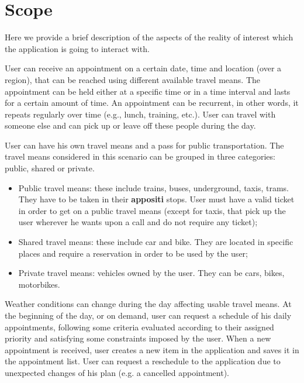\section{Scope}
Here we provide a brief description of the aspects of the reality of interest which the application is going to interact with.

User can receive an appointment on a certain date, time and location (over a region), that can be reached using different available travel means. The appointment can be held either at a specific time or in a time interval and lasts for a certain amount of time. An appointment can be recurrent, in other words, it repeats regularly over time (e.g., lunch, training, etc.). User can travel with someone else and can pick up or leave off these people during the day.

User can have his own travel means and a pass for public transportation. 
The travel means considered in this scenario can be grouped in three categories: public, shared or private.
\begin{itemize}
\item Public travel means: these include trains, buses, underground, taxis, trams. They have to be taken in their \textbf{appositi} stops. User must have a valid ticket in order to get on a public travel means (except for taxis, that pick up the user wherever he wants upon a call and do not require any ticket); 
\item Shared travel means: these include car and bike. They are located in specific places and require a reservation in order to be used by the user;
\item Private travel means: vehicles owned by the user. They can be cars, bikes, motorbikes.
\end{itemize}

Weather conditions can change during the day affecting usable travel means.
At the beginning of the day, or on demand, user can request a schedule of his daily appointments, following some criteria evaluated according to their assigned priority and satisfying some constraints imposed by the user.
When a new appointment is received, user creates a new item in the application and saves it in the appointment list. User can request a reschedule to the application due to unexpected changes of his plan (e.g. a cancelled appointment).

